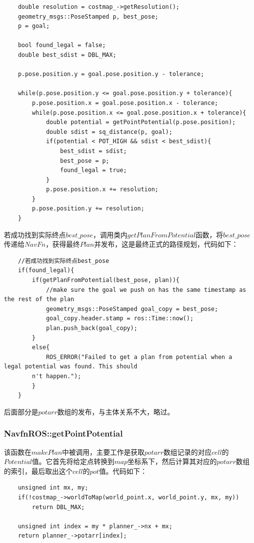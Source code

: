 \documentclass[9pt, oneside]{book}
\begin{document}
\begin{verbatim}
    double resolution = costmap_->getResolution();
    geometry_msgs::PoseStamped p, best_pose;
    p = goal;

    bool found_legal = false;
    double best_sdist = DBL_MAX;

    p.pose.position.y = goal.pose.position.y - tolerance;

    while(p.pose.position.y <= goal.pose.position.y + tolerance){
        p.pose.position.x = goal.pose.position.x - tolerance;
        while(p.pose.position.x <= goal.pose.position.x + tolerance){
            double potential = getPointPotential(p.pose.position);
            double sdist = sq_distance(p, goal);
            if(potential < POT_HIGH && sdist < best_sdist){
                best_sdist = sdist;
                best_pose = p;
                found_legal = true;
            }
            p.pose.position.x += resolution;
        }
        p.pose.position.y += resolution;
    }
\end{verbatim}

若成功找到实际终点$best\_pose$，调用类内$getPlanFromPotential$函数，将$best\_pose$传递给$NavFn$，获得最终$Plan$并发布，这是最终正式的路径规划，代码如下：

\footnotesize
\begin{verbatim}
    //若成功找到实际终点best_pose
    if(found_legal){
        if(getPlanFromPotential(best_pose, plan)){
            //make sure the goal we push on has the same timestamp as the rest of the plan
            geometry_msgs::PoseStamped goal_copy = best_pose;
            goal_copy.header.stamp = ros::Time::now();
            plan.push_back(goal_copy);
        }
        else{
            ROS_ERROR("Failed to get a plan from potential when a legal potential was found. This should
        n't happen.");
        }
    }
\end{verbatim}
\normalsize

后面部分是$potarr$数组的发布，与主体关系不大，略过。

\subsubsection{NavfnROS::getPointPotential}

该函数在$makePlan$中被调用，主要工作是获取$potarr$数组记录的对应$cell$的$Potential$值。它首先将给定点转换到$map$坐标系下，然后计算其对应的$potarr$数组的索引，最后取出这个$cell$的$pot$值。代码如下：

\begin{verbatim}
    unsigned int mx, my;
    if(!costmap_->worldToMap(world_point.x, world_point.y, mx, my))
        return DBL_MAX;

    unsigned int index = my * planner_->nx + mx;
    return planner_->potarr[index];
\end{verbatim}
\end{document}

